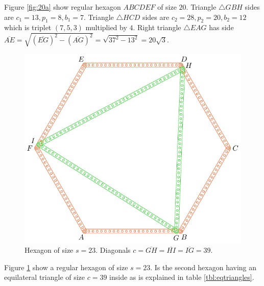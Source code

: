 \documentclass[11pt]{article}
\begin{document}
Figure \ref{fig:20a} show regular hexagon $ABCDEF$ of size $20$. Triangle $\triangle{GBH}$ sides are $c_1=13,p_1=8,b_1=7$. Triangle $\triangle{HCD}$ sides are $c_2=28,p_2=20,b_2=12$ which is triplet $(7,5,3)$ multiplied by $4$. Right triangle $\triangle{EAG}$ has side $\overline{AE} = \sqrt{(\overline{EG})^2 - (\overline{AG})^2} = \sqrt{37^2 - 13^2} = 20\sqrt3$.


\begin{figure}[H]
\centering
\includegraphics[scale=1]{23/hexa-23a}
\caption{Hexagon of size $s = 23$. Diagonals $c = \overline{GH} = \overline{HI} = \overline{IG} = 39$.}
\label{fig:23a}
\end{figure}

Figure \ref{fig:23a} show a regular hexagon of size $s=23$. Is the second hexagon having an equilateral triangle of size $c=39$ inside as is explained in table \ref{tbl:eqtriangles}.
\end{document}
